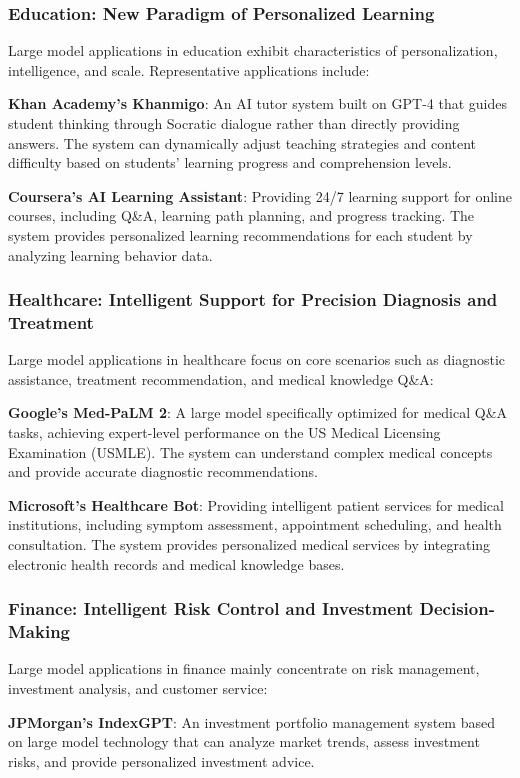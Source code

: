 \documentclass{article}
\begin{document}
\subsubsection{Education: New Paradigm of Personalized Learning}
Large model applications in education exhibit characteristics of personalization, intelligence, and scale. Representative applications include:

\textbf{Khan Academy's Khanmigo}: An AI tutor system built on GPT-4 that guides student thinking through Socratic dialogue rather than directly providing answers. The system can dynamically adjust teaching strategies and content difficulty based on students' learning progress and comprehension levels.

\textbf{Coursera's AI Learning Assistant}: Providing 24/7 learning support for online courses, including Q\&A, learning path planning, and progress tracking. The system provides personalized learning recommendations for each student by analyzing learning behavior data.

\subsubsection{Healthcare: Intelligent Support for Precision Diagnosis and Treatment}
Large model applications in healthcare focus on core scenarios such as diagnostic assistance, treatment recommendation, and medical knowledge Q\&A:

\textbf{Google's Med-PaLM 2}: A large model specifically optimized for medical Q\&A tasks, achieving expert-level performance on the US Medical Licensing Examination (USMLE). The system can understand complex medical concepts and provide accurate diagnostic recommendations.

\textbf{Microsoft's Healthcare Bot}: Providing intelligent patient services for medical institutions, including symptom assessment, appointment scheduling, and health consultation. The system provides personalized medical services by integrating electronic health records and medical knowledge bases.

\subsubsection{Finance: Intelligent Risk Control and Investment Decision-Making}
Large model applications in finance mainly concentrate on risk management, investment analysis, and customer service:

\textbf{JPMorgan's IndexGPT}: An investment portfolio management system based on large model technology that can analyze market trends, assess investment risks, and provide personalized investment advice.
\end{document}

